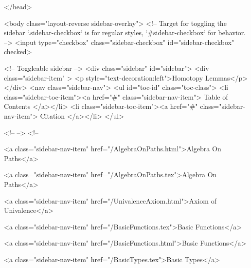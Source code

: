   
</head>




  <body class="layout-reverse sidebar-overlay">
    <!-- Target for toggling the sidebar `.sidebar-checkbox` is for regular
     styles, `#sidebar-checkbox` for behavior. -->
<input type="checkbox" class="sidebar-checkbox" id="sidebar-checkbox" checked>

<!-- Toggleable sidebar -->
<div class="sidebar" id="sidebar">
  <div class="sidebar-item" >
    <p style="text-decoration:left">Homotopy Lemmas</p>
  </div>
  <nav class="sidebar-nav">
    <ul id="toc-id" class="toc-class">
  <li class="sidebar-toc-item"><a href="#" class="sidebar-nav-item"> Table of Contents </a></li>
  <li class="sidebar-toc-item"><a href="#" class="sidebar-nav-item"> Citation </a></li>
</ul>


    <!--  -->
    <!-- 
      
    
      
    
      
    
      
        
      
    
      
        
          <a class="sidebar-nav-item" href="/AlgebraOnPaths.html">Algebra On Paths</a>
        
      
    
      
        
          <a class="sidebar-nav-item" href="/AlgebraOnPaths.tex">Algebra On Paths</a>
        
      
    
      
        
          <a class="sidebar-nav-item" href="/UnivalenceAxiom.html">Axiom of Univalence</a>
        
      
    
      
        
          <a class="sidebar-nav-item" href="/BasicFunctions.tex">Basic Functions</a>
        
      
    
      
        
          <a class="sidebar-nav-item" href="/BasicFunctions.html">Basic Functions</a>
        
      
    
      
        
          <a class="sidebar-nav-item" href="/BasicTypes.tex">Basic Types</a>
        
      
    
      
        
